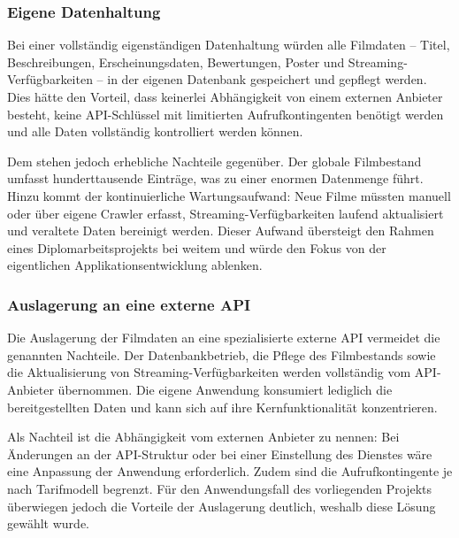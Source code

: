 \subsubsection*{Eigene Datenhaltung}

Bei einer vollständig eigenständigen Datenhaltung würden alle Filmdaten --
Titel, Beschreibungen, Erscheinungsdaten, Bewertungen, Poster und
Streaming-Verfügbarkeiten -- in der eigenen Datenbank gespeichert und
gepflegt werden. Dies hätte den Vorteil, dass keinerlei Abhängigkeit von
einem externen Anbieter besteht, keine API-Schlüssel mit limitierten
Aufrufkontingenten benötigt werden und alle Daten vollständig kontrolliert
werden können.

Dem stehen jedoch erhebliche Nachteile gegenüber. Der globale Filmbestand
umfasst hunderttausende Einträge, was zu einer enormen Datenmenge führt.
Hinzu kommt der kontinuierliche Wartungsaufwand: Neue Filme müssten manuell
oder über eigene Crawler erfasst, Streaming-Verfügbarkeiten laufend
aktualisiert und veraltete Daten bereinigt werden. Dieser Aufwand übersteigt
den Rahmen eines Diplomarbeitsprojekts bei weitem und würde den Fokus von
der eigentlichen Applikationsentwicklung ablenken.

\subsubsection*{Auslagerung an eine externe API}

Die Auslagerung der Filmdaten an eine spezialisierte externe API vermeidet
die genannten Nachteile. Der Datenbankbetrieb, die Pflege des Filmbestands
sowie die Aktualisierung von Streaming-Verfügbarkeiten werden vollständig
vom API-Anbieter übernommen. Die eigene Anwendung konsumiert lediglich die
bereitgestellten Daten und kann sich auf ihre Kernfunktionalität
konzentrieren.

Als Nachteil ist die Abhängigkeit vom externen Anbieter zu nennen: Bei
Änderungen an der API-Struktur oder bei einer Einstellung des Dienstes
wäre eine Anpassung der Anwendung erforderlich. Zudem sind die Aufrufkontingente
je nach Tarifmodell begrenzt. Für den Anwendungsfall des vorliegenden Projekts
überwiegen jedoch die Vorteile der Auslagerung deutlich, weshalb diese Lösung
gewählt wurde.

